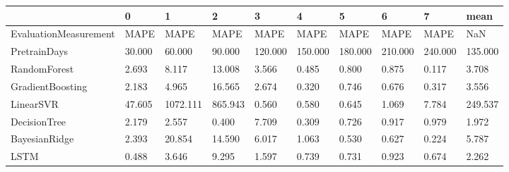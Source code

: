 \begin{tabular}{llllllllll}
\toprule
{} &      0 &        1 &       2 &       3 &       4 &       5 &       6 &       7 &    mean \\
\midrule
EvaluationMeasurement &   MAPE &     MAPE &    MAPE &    MAPE &    MAPE &    MAPE &    MAPE &    MAPE &     NaN \\
PretrainDays          & 30.000 &   60.000 &  90.000 & 120.000 & 150.000 & 180.000 & 210.000 & 240.000 & 135.000 \\
RandomForest          &  2.693 &    8.117 &  13.008 &   3.566 &   0.485 &   0.800 &   0.875 &   0.117 &   3.708 \\
GradientBoosting      &  2.183 &    4.965 &  16.565 &   2.674 &   0.320 &   0.746 &   0.676 &   0.317 &   3.556 \\
LinearSVR             & 47.605 & 1072.111 & 865.943 &   0.560 &   0.580 &   0.645 &   1.069 &   7.784 & 249.537 \\
DecisionTree          &  2.179 &    2.557 &   0.400 &   7.709 &   0.309 &   0.726 &   0.917 &   0.979 &   1.972 \\
BayesianRidge         &  2.393 &   20.854 &  14.590 &   6.017 &   1.063 &   0.530 &   0.627 &   0.224 &   5.787 \\
LSTM                  &  0.488 &    3.646 &   9.295 &   1.597 &   0.739 &   0.731 &   0.923 &   0.674 &   2.262 \\
\bottomrule
\end{tabular}
